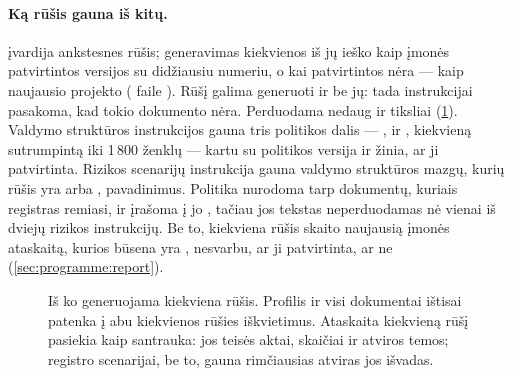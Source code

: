 \paragraph{Ką rūšis gauna iš kitų.}  įvardija ankstesnes rūšis; generavimas
kiekvienos iš jų ieško kaip įmonės patvirtintos versijos su didžiausiu numeriu, o kai
patvirtintos nėra --- kaip naujausio projekto ( faile
). Rūšį galima generuoti ir be jų: tada instrukcijai pasakoma, kad tokio
dokumento nėra. Perduodama nedaug ir tiksliai (\cref{fig:programme:builds}). Valdymo struktūros
instrukcijos gauna tris politikos dalis --- ,  ir ,
kiekvieną sutrumpintą iki 1\,800 ženklų --- kartu su politikos versija ir žinia, ar ji
patvirtinta. Rizikos scenarijų instrukcija gauna valdymo struktūros mazgų, kurių rūšis yra
 arba , pavadinimus. Politika nurodoma tarp dokumentų, kuriais
registras remiasi, ir įrašoma į jo , tačiau jos tekstas neperduodamas nė vienai iš
dviejų rizikos instrukcijų. Be to, kiekviena rūšis skaito naujausią įmonės ataskaitą, kurios
būsena yra , nesvarbu, ar ji patvirtinta, ar ne (\cref{sec:programme:report}).

\begin{figure}[H]
\centering
{}
\caption{Iš ko generuojama kiekviena rūšis. Profilis ir visi dokumentai ištisai patenka į abu
kiekvienos rūšies iškvietimus. Ataskaita kiekvieną rūšį pasiekia kaip santrauka: jos teisės
aktai, skaičiai ir atviros temos; registro scenarijai, be to, gauna rimčiausias atviras jos
išvadas.}\label{fig:programme:builds}
\end{figure}

